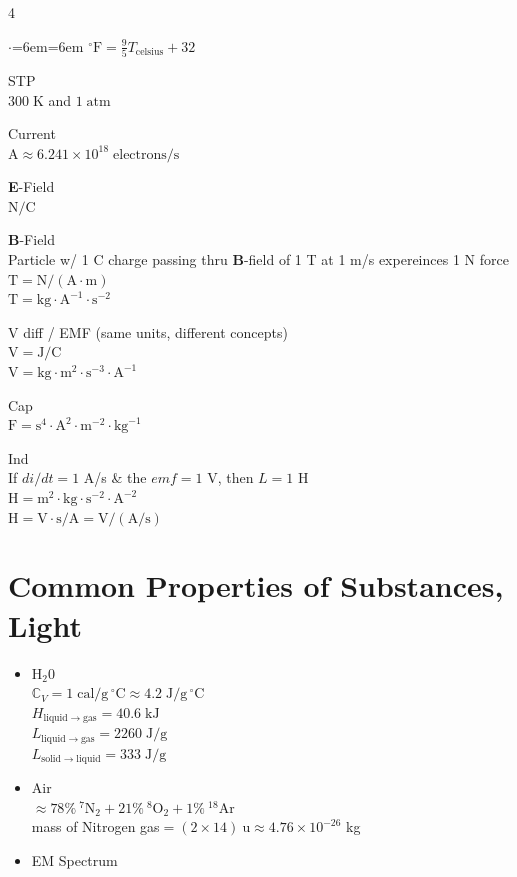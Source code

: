\documentclass[letterpaper,landscape,10pt]{article}
\newenvironment{myitemize}
{\begin{itemize}
	\setlength{\itemsep}{0pt}
	\setlength{\parskip}{0pt}
	\setlength{\parsep}{0pt}}
{\end{itemize}}
\newenvironment{litemize}
{\begin{list}{$\cdot$}{\leftmargin=6em\labelwidth=6em}
	\setlength{\itemsep}{0pt}
	\setlength{\parskip}{0pt}
	\setlength{\parsep}{0pt}}
{\end{list}}
\begin{document}
{\begin{multicols}{4}
\begin{litemize}
		  $\mathrm{^\circ F} = \frac{9}{5}T_{\mathrm{celsius}}+32$
		\item[STP] \ \\
		  $300\;\mathrm{K}$ and $1\;\mathrm{atm}$
	  	\item[Current] \ \\
		  $\mathrm{A}\approx
		  	6.241\times 10^{18}\;\mathrm{electrons} / \mathrm{s}$
		\item[\textbf{E}-Field] \ \\
			$\mathrm{N/C}$
		\item[\textbf{B}-Field] \ \\
			Particle w/ 1 C charge passing thru $\bm{B}$-field of 1 T at 1 m/s expereinces 1 N force \\
			$\mathrm{T} = \mathrm{N/(A \cdot m)}$ \\
			$\mathrm{T} = \mathrm{kg\cdot A^{-1} \cdot s^{-2}}$
	  	\item[V diff] / EMF (same units, different concepts) \\
			$\mathrm{V} = \mathrm{J}/\mathrm{C}$ \\
			$\mathrm{V} = \mathrm{kg\cdot{m}^2\cdot{s}^{-3}\cdot{A}^{-1}}$
	  	\item[Cap] \ \\
			$\mathrm{F} = \mbox{s}^4 \cdot \mbox{A}^2 \cdot \mbox{m}^{-2}
				\cdot \mbox{kg}^{-1}$
	  	\item[Ind] \ \\
			If $di/dt = 1$ A/s \& the $emf = 1$ V, then $L = 1$ H \\
			$\mathrm{H} = \mathrm{m}^2\cdot\mathrm{kg}\cdot
				\mathrm{s}^{-2}\cdot\mathrm{A}^{-2}$ \\
			$\mathrm{H} = \mathrm{V\cdot{s}/{A}=V/(A/s)}$
	\end{litemize}

\section*{Common Properties of Substances, Light}
	\begin{myitemize}
		\item[H$_2$0] \ \\
			$\mathbb{C}_V = 1 \;\mathrm{cal}/\mathrm{g}\,^\circ \mathrm{C}
				\approx 4.2 \;\mathrm{J}/\mathrm{g}\,^\circ \mathrm{C}$ \\
			$H_{\mathrm{liquid\rightarrow gas}} = 40.6 \;\mathrm{kJ}$ \\
			$L_{\mathrm{liquid\rightarrow gas}} = 2260 \;\mathrm{J/g}$ \\
			$L_{\mathrm{solid\rightarrow liquid}} = 333 \;\mathrm{J/g}$ \\
		\item[Air] \ \\
			$\approx 78\% \ ^7\mathrm{N}_2 + 21\%  \ ^8\mathrm{O}_2 + 1\%  \ 
				^{18}\mathrm{Ar}$\\
			mass of Nitrogen gas$= (2\times 14)\:\mathrm{u} \approx 4.76\times10^{-26}$ kg
		\item[EM Spectrum] \ \\



\end{myitemize}
\end{multicols}}
\end{document}
